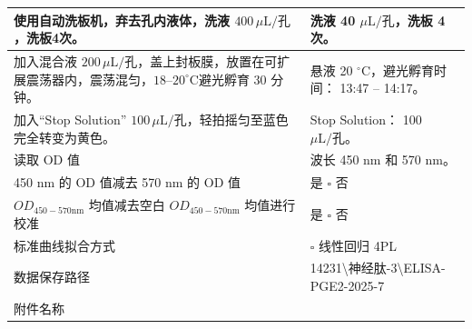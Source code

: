 \documentclass[UTF8,10pt,a4paper,fontset=fandol]{ctexart}
\newcommand{\fieldvalue}[1]{#1}
\newcommand{\handwritten}[1]{#1}
\begin{document}
\begin{tabularx}{\textwidth}{|p{}|X|}
\hline
使用自动洗板机，弃去孔内液体，洗液 $400\,\mu\mathrm{L}/孔$，洗板4次。 &
洗液
\fieldvalue{\handwritten{40}} $\mu\mathrm{L}/孔$，洗板
\fieldvalue{\handwritten{4}} 次。\\
\hline
加入混合液 $200\,\mu\mathrm{L}/孔$，盖上封板膜，放置在可扩展震荡器内，震荡混匀，$18$--$20^\circ\mathrm{C}$避光孵育 $30$ 分钟。 &
悬液
\fieldvalue{\handwritten{20}} $^\circ\mathrm{C}$，避光孵育时间：
\fieldvalue{\handwritten{13:47}} --
\fieldvalue{\handwritten{14:17}}。\\
\hline
加入“Stop Solution” $100\,\mu\mathrm{L}/孔$，轻拍摇匀至蓝色完全转变为黄色。 &
Stop Solution：
\fieldvalue{\handwritten{100}} $\mu\mathrm{L}/孔$。\\
\hline
读取 OD 值 &
波长
\fieldvalue{\handwritten{450}} nm 和
\fieldvalue{\handwritten{570}} nm。\\
\hline
450 nm 的 OD 值减去 570 nm 的 OD 值 &
\fieldvalue{\handwritten{\checkmark}} 是 \quad $\square$ 否\\
\hline
$OD_{450-570\mathrm{nm}}$ 均值减去空白 $OD_{450-570\mathrm{nm}}$ 均值进行校准 &
\fieldvalue{\handwritten{\checkmark}} 是 \quad $\square$ 否\\
\hline
标准曲线拟合方式 &
$\square$ 线性回归 \quad
\fieldvalue{\handwritten{\checkmark}} 4PL\\
\hline
数据保存路径 &
\fieldvalue{\handwritten{14231\textbackslash 神经肽-3\textbackslash ELISA-PGE2-2025-7}}\\
\hline
附件名称 &

\end{tabularx}
\end{document}
